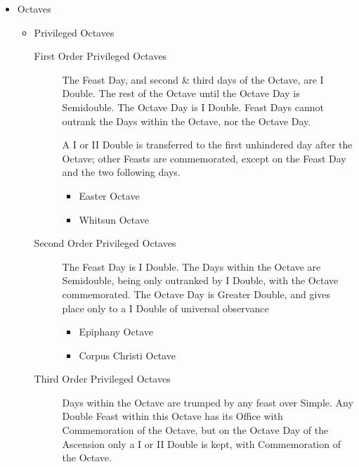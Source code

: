 \begin{itemize}
    \item Octaves
        \begin{itemize}
            \item Privileged Octaves
                \begin{description}
                    \item[First Order Privileged Octaves] The Feast Day, and second \& third days of the Octave, are I Double. The rest of the Octave until the Octave Day is Semidouble. The Octave Day is I Double. Feast Days cannot outrank the Days within the Octave, nor the Octave Day.\par
                    A I or II Double is transferred to the first unhindered day after the Octave; other Feasts are commemorated, except on the Feast Day and the two following days.
                        \begin{itemize}
                            \item Easter Octave
                            \item Whitsun Octave
                        \end{itemize}
                    \item[Second Order Privileged Octaves] The Feast Day is I Double. The Days within the Octave are Semidouble, being only outranked by I Double, with the Octave commemorated. The Octave Day is Greater Double, and gives place only to a I Double of universal observance
                        \begin{itemize}
                            \item Epiphany Octave
                            \item Corpus Christi Octave
                        \end{itemize}
                    \item[Third Order Privileged Octaves] Days within the Octave are trumped by any feast over Simple. Any Double Feast within this Octave has its Office with Commemoration of the Octave, but on the Octave Day of the Ascension only a I or II Double is kept, with Commemoration of the Octave.

\end{description}
\end{itemize}
\end{itemize}

